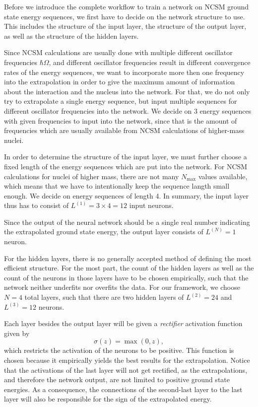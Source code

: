 Before we introduce the complete workflow to train a network on NCSM ground state energy sequences, we first have to decide on the network structure to use.
This includes the structure of the input layer, the structure of the output layer, as well as the structure of the hidden layers.

Since NCSM calculations are usually done with multiple different oscillator frequencies $\hbar \Omega$, and different oscillator frequencies result in different convergence rates of the energy sequences, we want to incorporate more then one frequency into the extrapolation in order to give the maximum amount of information about the interaction and the nucleus into the network.
For that, we do not only try to extrapolate a single energy sequence, but input multiple sequences for different oscillator frequencies into the network.
We decide on 3 energy sequences with given frequencies to input into the network, since that is the amount of frequencies which are usually available from NCSM calculations of higher-mass nuclei.

In order to determine the structure of the input layer, we must further choose a fixed length of the energy sequences which are put into the network.
For NCSM calculations for nuclei of higher mass, there are not many $N_\mathrm{max}$ values available, which means that we have to intentionally keep the sequence langth small enough.
We decide on energy sequences of length 4.
In summary, the input layer thus has to consist of $L^{(1)} = 3\times 4 = 12$ input neurons.

Since the output of the neural network should be a single real number indicating the extrapolated ground state energy, the output layer consists of $L^{(N)} = 1$ neuron.

For the hidden layers, there is no generally accepted method of defining the most efficient structure. For the most part, the count of the hidden layers as well as the count of the neurons in those layers have to be chosen empirically, such that the network neither underfits nor overfits the data. For our framework, we choose $N = 4$ total layers, such that there are two hidden layers of $L^{(2)} = 24$ and $L^{(3)} = 12$ neurons.

Each layer besides the output layer will be given a \textit{rectifier} activation function given by
\begin{equation}
  \sigma(z) = \max(0, z),
\end{equation}
which restricts the activation of the neurons to be positive. This function is chosen because it empirically yields the best results for the extrapolation. Notice that the activations of the last layer will not get rectified, as the extrapolations, and therefore the network output, are not limited to positive ground state energies. As a consequence, the connections of the second-last layer to the last layer will also be responsible for the sign of the extrapolated energy.

